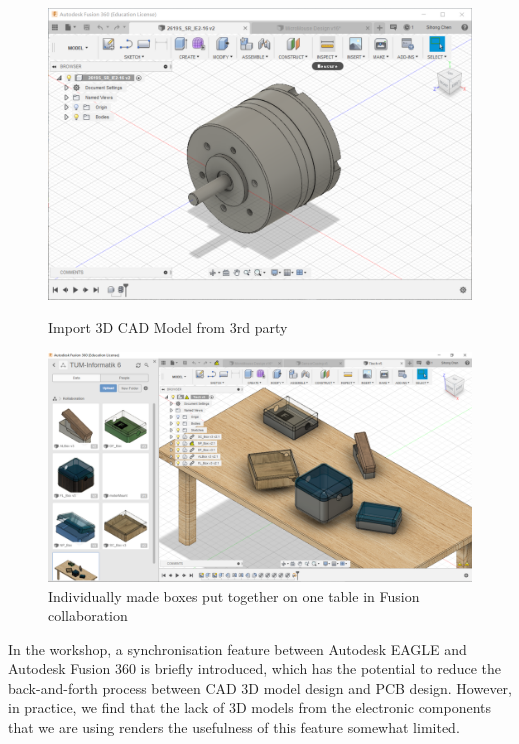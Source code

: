 \begin{figure}[htb]
    \begin{minipage}[b]{0.4\textwidth}
    	\includegraphics[width=\textwidth]{figures/Casing/FusionImport.PNG}
    	\caption{Import 3D CAD Model from 3rd party}
    	\label{fig:fusion_import}
  	\end{minipage}
 
  	\begin{minipage}[b]{0.4\textwidth}
  	  \includegraphics[width=\textwidth]{figures/Casing/FusionCollaborationTable.PNG}
  	  \caption{Individually made boxes put together on one table in Fusion collaboration}
  	  \label{fig:fusion_collab_table}
  	\end{minipage}
\end{figure}

In the workshop, a synchronisation feature between Autodesk EAGLE and Autodesk Fusion 360 is briefly introduced, which has the potential to reduce the back-and-forth process between CAD 3D model design and PCB design. However, in practice, we find that the lack of 3D models from the electronic components that we are using renders the usefulness of this feature somewhat limited.

